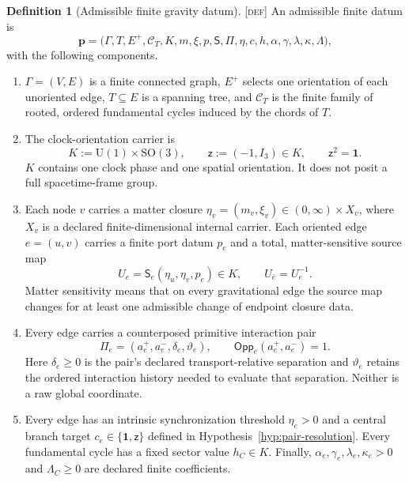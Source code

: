 \documentclass[11pt]{article}
\newcommand{\Graph}{\ensuremath{\Gamma}}
\newcommand{\Uone}{\ensuremath{\mathrm U(1)}}
\newcommand{\SOthree}{\ensuremath{\mathrm{SO}(3)}}
\newcommand{\Id}{\ensuremath{\mathbf 1}}
\newcommand{\zinv}{\ensuremath{\mathsf z}}
\newcommand{\Pair}{\ensuremath{\Pi}}
\newcommand{\Defn}{\textsc{[def]}}
\theoremstyle{definition}
\newtheorem{definition}{Definition}[section]
\begin{document}
\begin{definition}[Admissible finite gravity datum]
\label{def:datum}
\Defn{} An admissible finite datum is
\begin{equation}
\mathbf p=\bigl(
\Graph,T,E^+,\mathcal C_T,K,m,\xi,p,\mathsf S,
\Pair,\eta,c,h,\alpha,\gamma,\lambda,\kappa,\Lambda
\bigr),
\label{eq:datum}
\end{equation}
with the following components.
\begin{enumerate}
\item $\Graph=(V,E)$ is a finite connected graph, $E^+$ selects one orientation
of each unoriented edge, $T\subseteq E$ is a spanning tree, and $\mathcal C_T$
is the finite family of rooted, ordered fundamental cycles induced by the chords
of $T$.
\item The clock-orientation carrier is
\begin{equation}
K:=\Uone\times\SOthree,
\qquad
\zinv:=(-1,I_3)\in K,
\qquad \zinv^2=\Id.
\label{eq:K}
\end{equation}
$K$ contains one clock phase and one spatial orientation.  It does not posit a
full spacetime-frame group.
\item Each node $v$ carries a matter closure
$\eta_v=(m_v,\xi_v)\in(0,\infty)\times X_v$, where $X_v$ is a declared
finite-dimensional internal carrier.  Each oriented edge $e=(u,v)$ carries a
finite port datum $p_e$ and a total, matter-sensitive source map
\begin{equation}
U_e=\mathsf S_e(\eta_u,\eta_v,p_e)\in K,
\qquad U_{\bar e}=U_e^{-1}.
\label{eq:source-map}
\end{equation}
Matter sensitivity means that on every gravitational edge the source map changes
for at least one admissible change of endpoint closure data.
\item Every edge carries a counterposed primitive interaction pair
\begin{equation}
\Pair_e=(a_e^+,a_e^-,\delta_e,\vartheta_e),
\qquad \mathsf{Opp}_e(a_e^+,a_e^-)=1.
\label{eq:pair}
\end{equation}
Here $\delta_e\ge0$ is the pair's declared transport-relative separation and
$\vartheta_e$ retains the ordered interaction history needed to evaluate that
separation.  Neither is a raw global coordinate.
\item Every edge has an intrinsic synchronization threshold $\eta_e>0$ and a
central branch target $c_e\in\{\Id,\zinv\}$ defined in
Hypothesis~\ref{hyp:pair-resolution}.  Every fundamental cycle has a fixed
sector value $h_C\in K$.  Finally,
$\alpha_e,\gamma_e,\lambda_e,\kappa_e>0$ and $\Lambda_C\ge0$ are declared
finite coefficients.
\end{enumerate}
\end{definition}
\end{document}
